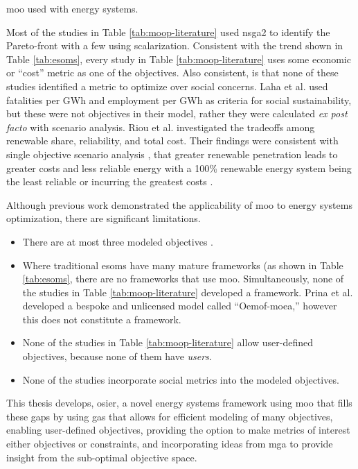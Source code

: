 \begin{table}[ht!]
    \centering
    \caption{\ac{moo} used with energy systems.}
    \label{tab:moop-literature}
    \resizebox*{\textwidth}{!}{}
\end{table}
Most of the studies in Table \ref{tab:moop-literature} used \ac{nsga2} to identify
the Pareto-front with a few using scalarization.
Consistent with the trend shown in Table \ref{tab:esoms}, every study in Table 
\ref{tab:moop-literature} uses some economic or ``cost'' metric as one of the 
objectives. Also consistent, is that none of these studies identified a metric to 
optimize over social concerns. Laha et al. \cite{laha_low_2021} used fatalities per 
GWh and employment per GWh as criteria for social sustainability, but these were not
objectives in their model, rather they were calculated \textit{ex post facto}
with scenario analysis. Riou et al. \cite{riou_multi-objective_2021} investigated
the tradeoffs among renewable share, reliability, and total cost. Their findings were
consistent with single objective scenario analysis \cite{de_sisternes_value_2016},
that greater renewable penetration leads to greater costs and less reliable energy 
with a 100\% renewable energy system being the least reliable or incurring the 
greatest costs \cite{riou_multi-objective_2021}. 

Although previous work demonstrated the applicability of \ac{moo} to energy systems
optimization, there are significant limitations. 
\begin{itemize}
    \item{There are at most three modeled objectives \cite{riou_multi-objective_2021,de-leon_almaraz_deployment_2015, de-leon_almaraz_assessment_2013}.}
    \item{Where traditional \acp{esom} have many mature frameworks (as shown in Table \ref{tab:esoms}, there are no frameworks that use \ac{moo}. Simultaneously, none of the studies in Table \ref{tab:moop-literature} developed a framework. Prina et al. developed a bespoke and unlicensed model called ``Oemof-moea,'' however this does not constitute a framework.}
    \item{None of the studies in Table \ref{tab:moop-literature} allow user-defined objectives, because none of them have \textit{users}.}
    \item{None of the studies incorporate social metrics into the modeled objectives.}
\end{itemize}

This thesis develops, \ac{osier}, a novel energy systems framework using \ac{moo} 
that fills these gaps by using \acp{ga} that allows for efficient modeling of many 
objectives, enabling user-defined objectives, providing the option to make metrics 
of interest either objectives or constraints, and incorporating ideas from \ac{mga} 
to provide insight from the sub-optimal objective space.



